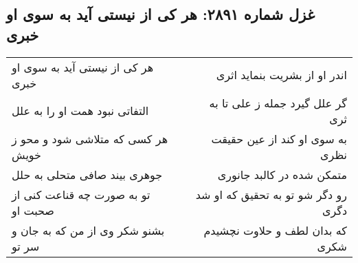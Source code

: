 \begin{center}
\section*{غزل شماره ۲۸۹۱: هر کی از نیستی آید به سوی او خبری}
\label{sec:2891}
\begin{longtable}{l p{0.5cm} r}
هر کی از نیستی آید به سوی او خبری
&&
اندر او از بشریت بنماید اثری
\\
التفاتی نبود همت او را به علل
&&
گر علل گیرد جمله ز علی تا به ثری
\\
هر کسی که متلاشی شود و محو ز خویش
&&
به سوی او کند از عین حقیقت نظری
\\
جوهری بیند صافی متحلی به حلل
&&
متمکن شده در کالبد جانوری
\\
تو به صورت چه قناعت کنی از صحبت او
&&
رو دگر شو تو به تحقیق که او شد دگری
\\
بشنو شکر وی از من که به جان و سر تو
&&
که بدان لطف و حلاوت نچشیدم شکری
\\
\end{longtable}
\end{center}
